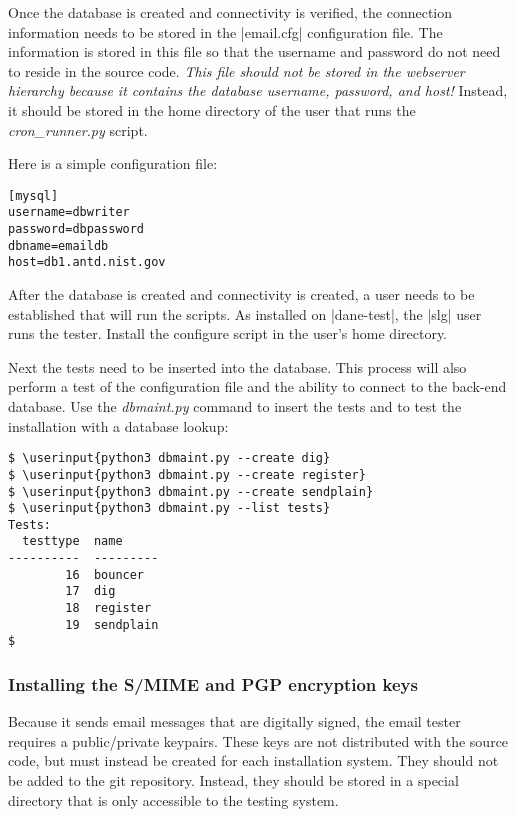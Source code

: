 \documentclass[preprint,3p,11pt]{elsarticle}
\newcommand\userinput[1]{\textbf{#1}}
\begin{document}
Once the database is created and connectivity is verified, the
connection information needs to be stored in the 
|email.cfg| configuration file. The information is stored in this file
so that the username and password do not need to reside in the source
code. \emph{This file should not be stored in the webserver
  hierarchy because it contains the database username, password, and
  host!} Instead, it should be stored in the home directory of the
user that runs the \emph{cron\_runner.py} script.

Here is a simple configuration file:

\begin{Verbatim}[commandchars=\\\{\},fontsize=\small]
[mysql]
username=dbwriter
password=dbpassword
dbname=emaildb
host=db1.antd.nist.gov
\end{Verbatim}

After the database is created and connectivity is created, a user
needs to be established that will run the scripts. As installed on
|dane-test|, the |slg| user runs the tester.   Install the configure
script in the user's home directory.

Next the tests need to be inserted into the database. This process
will also perform a test of the configuration file and the ability to
connect to the back-end database. Use the \emph{dbmaint.py} command to
insert the tests and to test the installation with a database lookup:

\begin{Verbatim}[commandchars=\\\{\},fontsize=\small]
$ \userinput{python3 dbmaint.py --create dig}
$ \userinput{python3 dbmaint.py --create register}
$ \userinput{python3 dbmaint.py --create sendplain}
$ \userinput{python3 dbmaint.py --list tests}
Tests:
  testtype  name
----------  ---------
        16  bouncer
        17  dig
        18  register
        19  sendplain
$
\end{Verbatim}

\subsubsection{Installing the S/MIME and PGP encryption keys}
Because it sends email messages that are digitally signed, the email
tester requires a public/private keypairs. These keys are not
distributed with the source code, but must instead be created for each
installation system. They should not be added to the git
repository. Instead, they should be stored in a special directory that
is only accessible to the testing system. 
\end{document}
